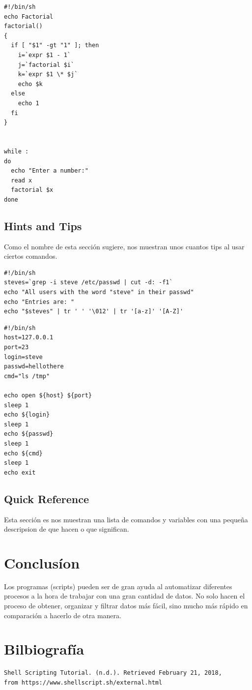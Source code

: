 \documentclass{article}
\begin{document}
\begin{verbatim}
#!/bin/sh
echo Factorial
factorial()
{
  if [ "$1" -gt "1" ]; then
    i=`expr $1 - 1`
    j=`factorial $i`
    k=`expr $1 \* $j`
    echo $k
  else
    echo 1
  fi
}


while :
do
  echo "Enter a number:"
  read x
  factorial $x
done  
\end{verbatim}

\subsection{Hints and Tips}
Como el nombre de esta sección sugiere, nos muestran unos cuantos tips al usar ciertos comandos.

\begin{verbatim}
#!/bin/sh
steves=`grep -i steve /etc/passwd | cut -d: -f1`
echo "All users with the word "steve" in their passwd"
echo "Entries are: "
echo "$steves" | tr ' ' '\012' | tr '[a-z]' '[A-Z]'
\end{verbatim}

\begin{verbatim}
#!/bin/sh
host=127.0.0.1
port=23
login=steve
passwd=hellothere
cmd="ls /tmp"

echo open ${host} ${port}
sleep 1
echo ${login}
sleep 1
echo ${passwd}
sleep 1
echo ${cmd}
sleep 1
echo exit
\end{verbatim}

\subsection{Quick Reference}
Esta sección es nos muestran una lista de comandos y variables con una pequeña descripsion de que hacen o que significan.


\section{Conclusíon}
Los programas (scripts) pueden ser de gran ayuda al automatizar diferentes procesos a la hora de trabajar con una gran cantidad de datos. No solo hacen el proceso de obtener, organizar y filtrar datos más fácil, sino mucho más rápido en comparación a hacerlo de otra manera.


\section{Bilbiografía}

\begin{verbatim}
Shell Scripting Tutorial. (n.d.). Retrieved February 21, 2018, 
from https://www.shellscript.sh/external.html 
\end{verbatim}
\end{document}
